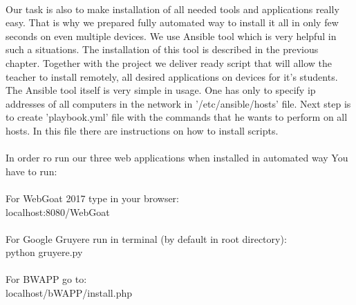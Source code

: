 \documentclass[12pt, a4paper]{article}
\begin{document}
\paragraph{}Our task is also to make installation of all needed tools and applications really easy. That is why we prepared fully automated way to install it all in only few seconds on even multiple devices. We use Ansible tool which is very helpful in such a situations. The installation of this tool is described in the previous chapter. Together with the project we deliver ready script that will allow the teacher to install remotely, all desired applications on devices for it's students. The Ansible tool itself is very simple in usage. One has only to specify ip addresses of all computers in the network in '/etc/ansible/hosts' file. Next step is to create 'playbook.yml' file with the commands that he wants to perform on all hosts. In this file there are instructions on how to install scripts.\\

\paragraph{}In order ro run our three web applications when installed in automated way You have to run:\\
\\
For WebGoat 2017 type in your browser:\\
localhost:8080/WebGoat\\
\\
For Google Gruyere run in terminal (by default in root directory):\\
python gruyere.py\\
\\
For BWAPP go to:\\
localhost/bWAPP/install.php\\
\end{document}
